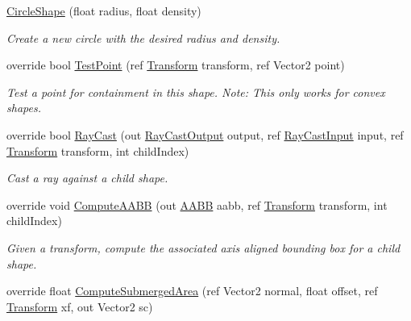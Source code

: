 \begin{DoxyCompactItemize}
\item 
\hyperlink{class_farseer_physics_1_1_collision_1_1_shapes_1_1_circle_shape_ae4fdd6a8106eab94903fe3c51887ee83}{Circle\+Shape} (float radius, float density)
\begin{DoxyCompactList}\small\item\em Create a new circle with the desired radius and density. \end{DoxyCompactList}\item 
override bool \hyperlink{class_farseer_physics_1_1_collision_1_1_shapes_1_1_circle_shape_ae9f2cfd3f8c13b74252ea17dfdd50fe8}{Test\+Point} (ref \hyperlink{struct_farseer_physics_1_1_common_1_1_transform}{Transform} transform, ref Vector2 point)
\begin{DoxyCompactList}\small\item\em Test a point for containment in this shape. Note\+: This only works for convex shapes. \end{DoxyCompactList}\item 
override bool \hyperlink{class_farseer_physics_1_1_collision_1_1_shapes_1_1_circle_shape_a1eab8740b9cbb0884e0d642042366b8a}{Ray\+Cast} (out \hyperlink{struct_farseer_physics_1_1_collision_1_1_ray_cast_output}{Ray\+Cast\+Output} output, ref \hyperlink{struct_farseer_physics_1_1_collision_1_1_ray_cast_input}{Ray\+Cast\+Input} input, ref \hyperlink{struct_farseer_physics_1_1_common_1_1_transform}{Transform} transform, int child\+Index)
\begin{DoxyCompactList}\small\item\em Cast a ray against a child shape. \end{DoxyCompactList}\item 
override void \hyperlink{class_farseer_physics_1_1_collision_1_1_shapes_1_1_circle_shape_abd995a9b57aed64683665f7f34f841c4}{Compute\+A\+A\+B\+B} (out \hyperlink{struct_farseer_physics_1_1_collision_1_1_a_a_b_b}{A\+A\+B\+B} aabb, ref \hyperlink{struct_farseer_physics_1_1_common_1_1_transform}{Transform} transform, int child\+Index)
\begin{DoxyCompactList}\small\item\em Given a transform, compute the associated axis aligned bounding box for a child shape. \end{DoxyCompactList}\item 
override float \hyperlink{class_farseer_physics_1_1_collision_1_1_shapes_1_1_circle_shape_a8d933774a4a46ea46a2d70aa097d6083}{Compute\+Submerged\+Area} (ref Vector2 normal, float offset, ref \hyperlink{struct_farseer_physics_1_1_common_1_1_transform}{Transform} xf, out Vector2 sc)

\end{DoxyCompactItemize}
